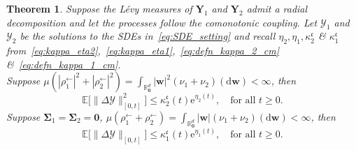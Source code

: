\documentclass[en,oneside,bbfont,article]{amsart}
\newtheorem{theorem}{Theorem}[section]
\theoremstyle{remark}
\theoremstyle{definition}
\theoremstyle{definition}
\newcommand\Y{\bm{\mathcal{Y}}}
\newcommand\R{\mathbb{R}}
\newcommand\E{\mathds{E}}
\newcommand\e{\mathord{\mathrm{e}}}
\newcommand\1{\mathds{1}}
\newcommand\la{\leftarrow}
\renewcommand\le{\leqslant}
\renewcommand\ge{\geqslant}
\newcommand\nf[1]{\normalfont{#1}}
\newcommand{\D}{\mathrm{d}}
\newcommand{\mfc}{{\mathfrak{c}}}
\begin{document}
\begin{theorem}\label{thm:gen_bound_como}
Suppose the L\'evy measures of $\bm{Y}_1$ and $\bm{Y}_2$ admit a radial decomposition and let the processes follow the comonotonic coupling. Let $\Y_1$ and $\Y_2$ be the solutions to the SDEs in~\eqref{eq:SDE_setting} and recall $\eta_2,\eta_1,\kappa_2^\mfc$ \& $\kappa_1^\mfc$ from~\eqref{eq:kappa_eta2},~\eqref{eq:kappa_eta1},~\eqref{eq:defn_kappa_2_cm} \&~\eqref{eq:defn_kappa_1_cm}.\\
{\nf{(a)}} Suppose $\mu(|\rho^\la_1|^2+|\rho^\la_2|^2) = \int_{\R^d_{\bm 0}}|\bm{w}|^2(\nu_1+\nu_2)(\D\bm{w})<\infty$, then
\begin{equation*}
\E\big[\|\Delta\Y\|_{[0,t]}^2\big] 
\le \kappa_2^\mfc(t)\e^{\eta_2(t)},
\quad \text{for all }t\ge 0.
\end{equation*}
{\nf{(b)}} Suppose $\bm{\Sigma}_1=\bm{\Sigma}_2=\bm{0}$, $\mu(\rho^\la_1+\rho^\la_2) = \int_{\R^d_{\bm 0}}|\bm{w}|(\nu_1+\nu_2)(\D\bm{w})<\infty$, then
\begin{equation*}
 \E\big[\|\Delta\Y\|_{[0,t]}\big] 
 \le \kappa_1^\mfc(t)\e^{\eta_1(t)},
 \quad \text{for all }t\ge 0.
\end{equation*}
\end{theorem}
\end{document}
